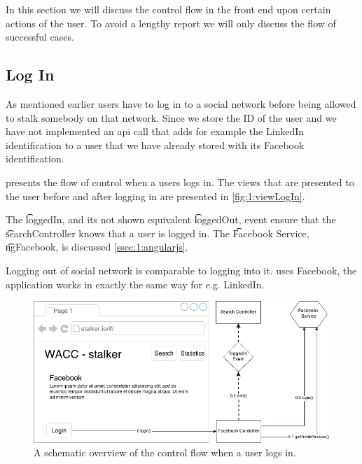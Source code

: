 In this section we will discuss the control flow in the front end upon certain actions of the user. To avoid a lengthy report we will only discuss the flow of successful cases.

\subsection{Log In}
	As mentioned earlier users have to log in to a social network before being allowed to stalk somebody on that network. Since we store the ID of the user and we have not implemented an api call that adds for example the LinkedIn identification to a user that we have already stored with its Facebook identification.

	 presents the flow of control when a users logs in. The views that are presented to the user before and after logging in are presented in \cref{fig:1:viewLogIn}.

	The \t{loggedIn}, and its not shown equivalent \t{loggedOut}, event ensure that the \t{searchController} knows that a user is logged in. The \t{Facebook Service}, \t{ngFacebook}, is discussed \vref{ssec:1:angularjs}. 

	Logging out of social network is comparable to logging into it.  uses Facebook, the application works in exactly the same way for e.g. LinkedIn.

	\begin{figure}
		\includegraphics[width=\textwidth]{./img/1_login_flow}
		\caption{A schematic overview of the control flow when a user logs in.}
		\label{fig:1:controlflowLogIn}
	\end{figure}

